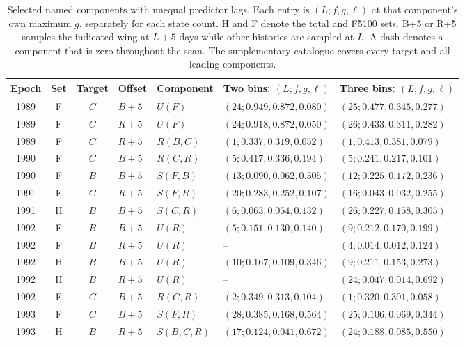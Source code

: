 \documentclass[fleqn,usenatbib]{mnras}
\newenvironment{SURDtable}{\begin{table}}{\end{table}}
\begin{document}
\begin{SURDtable}
\centering
\caption{Selected named components with unequal predictor lags. Each entry is $(L;f,g,\ell)$ at that component's own maximum $g$, separately for each state count. H and F denote the total and F5100 sets. B+5 or R+5 samples the indicated wing at $L+5$ days while other histories are sampled at $L$. A dash denotes a component that is zero throughout the scan. The supplementary catalogue covers every target and all leading components.}
\label{tab:selected_mixed}
\small
\begin{tabular}{cccllll}
\toprule
Epoch & Set & Target & Offset & Component & Two bins: $(L;f,g,\ell)$ & Three bins: $(L;f,g,\ell)$ \\
\midrule
1989 & F & $C$ & $B+5$ & $U(F)$ & $(24;0.949,0.872,0.080)$ & $(25;0.477,0.345,0.277)$ \\
1989 & F & $C$ & $R+5$ & $U(F)$ & $(24;0.918,0.872,0.050)$ & $(26;0.433,0.311,0.282)$ \\
1989 & F & $C$ & $R+5$ & $R(B,C)$ & $(1;0.337,0.319,0.052)$ & $(1;0.413,0.381,0.079)$ \\
1990 & F & $C$ & $B+5$ & $R(C,R)$ & $(5;0.417,0.336,0.194)$ & $(5;0.241,0.217,0.101)$ \\
1990 & F & $B$ & $B+5$ & $S(F,B)$ & $(13;0.090,0.062,0.305)$ & $(12;0.225,0.172,0.236)$ \\
1991 & F & $C$ & $R+5$ & $S(F,R)$ & $(20;0.283,0.252,0.107)$ & $(16;0.043,0.032,0.255)$ \\
1991 & H & $B$ & $B+5$ & $S(C,R)$ & $(6;0.063,0.054,0.132)$ & $(26;0.227,0.158,0.305)$ \\
1992 & F & $B$ & $B+5$ & $U(R)$ & $(5;0.151,0.130,0.140)$ & $(9;0.212,0.170,0.199)$ \\
1992 & F & $B$ & $R+5$ & $U(R)$ & -- & $(4;0.014,0.012,0.124)$ \\
1992 & H & $B$ & $B+5$ & $U(R)$ & $(10;0.167,0.109,0.346)$ & $(9;0.211,0.153,0.273)$ \\
1992 & H & $B$ & $R+5$ & $U(R)$ & -- & $(24;0.047,0.014,0.692)$ \\
1992 & F & $C$ & $B+5$ & $R(C,R)$ & $(2;0.349,0.313,0.104)$ & $(1;0.320,0.301,0.058)$ \\
1993 & F & $C$ & $B+5$ & $S(F,R)$ & $(28;0.385,0.168,0.564)$ & $(25;0.106,0.069,0.344)$ \\
1993 & H & $B$ & $R+5$ & $S(B,C,R)$ & $(17;0.124,0.041,0.672)$ & $(24;0.188,0.085,0.550)$ \\
\bottomrule
\end{tabular}
\end{SURDtable}
\end{document}
